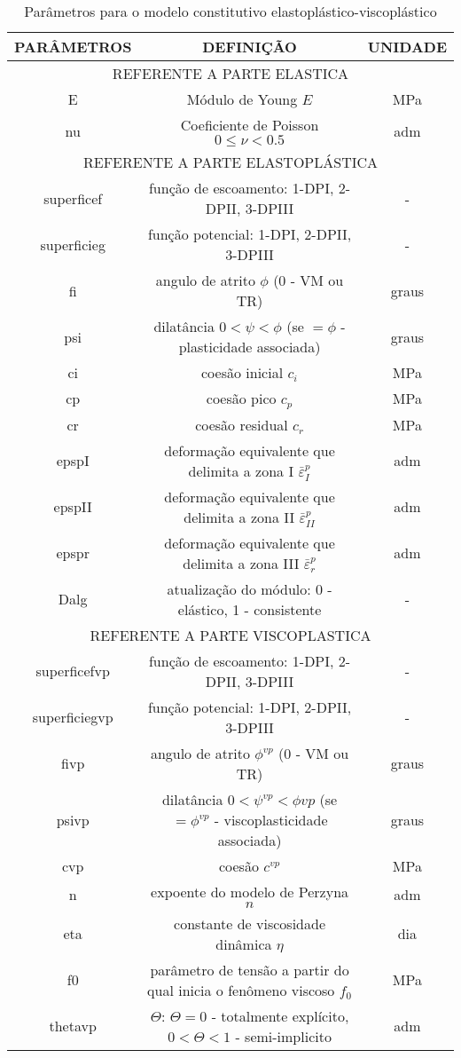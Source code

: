 \begin{table}[H]
	\caption{Parâmetros para o modelo constitutivo elastoplástico-viscoplástico}
	\label{parametros_EPVP}
	\centering
	\small
	\renewcommand{\arraystretch}{1.25}
	\begin{tabular}{c c c}
		\hline
		\multicolumn{1}{c}{\textbf{PARÂMETROS}} &
		\multicolumn{1}{c}{\textbf{DEFINIÇÃO}} &
		\multicolumn{1}{c}{\textbf{UNIDADE}} \\
		\hline
		\multicolumn{3}{c}{REFERENTE A PARTE ELASTICA} \\
		\hline
		E & Módulo de Young $E$  & MPa \\			
		nu & Coeficiente de Poisson $0 \leq \nu<0.5$  & adm \\		
		\hline
		\multicolumn{3}{c}{REFERENTE A PARTE ELASTOPLÁSTICA} \\
		\hline
		superficef & função de escoamento: 1-DPI, 2-DPII, 3-DPIII  & - \\		
		superficieg & função potencial: 1-DPI, 2-DPII, 3-DPIII & - \\
		fi & angulo de atrito $\phi$ (0 - VM ou TR) & graus \\		
		psi & dilatância $0<\psi<\phi$ (se $=\phi$ - plasticidade associada) & graus \\	
		ci & coesão inicial $c_i$ & MPa \\
		cp & coesão pico $c_p$ & MPa \\
		cr & coesão residual $c_r$ & MPa \\ 
		epspI & deformação equivalente que delimita a zona I $\bar \varepsilon^p_{I}$ & adm \\
		epspII & deformação equivalente que delimita a zona II $\bar \varepsilon^p_{II}$ & adm \\
		epspr & deformação equivalente que delimita a zona III $\bar \varepsilon^p_{r}$ & adm \\	
		Dalg & atualização do módulo: 0 - elástico, 1 - consistente & - \\					
		\hline
		\multicolumn{3}{c}{REFERENTE A PARTE VISCOPLASTICA} \\
		\hline
		superficefvp & função de escoamento: 1-DPI, 2-DPII, 3-DPIII  & - \\
		superficiegvp & função potencial: 1-DPI, 2-DPII, 3-DPIII & - \\
		fivp & angulo de atrito $\phi^{vp}$ (0 - VM ou TR) & graus \\
		psivp & dilatância $0<\psi^{vp}<\phi{vp}$ (se $=\phi^{vp}$ - viscoplasticidade associada) & graus \\
		cvp & coesão $c^{vp}$ & MPa \\
		n & expoente do modelo de Perzyna $n$ & adm \\
		eta & constante de viscosidade dinâmica $\eta$ & dia \\
		f0 & parâmetro de tensão a partir do qual inicia o fenômeno viscoso $f_0$ & MPa \\
		thetavp & $\Theta$: $\Theta=0$ - totalmente explícito, $0<\Theta<1$ - semi-implicito & adm \\
		\hline
	\end{tabular}
	\normalsize
\end{table}
